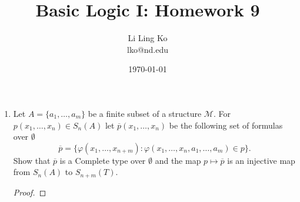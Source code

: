 \documentclass{article}
\begin{document}
\title{Basic Logic I: Homework 9}
\author{Li Ling Ko\\ lko@nd.edu}
\date{\today}
\maketitle

\begin{enumerate}[label={\bf Q\arabic*:}]
  \item Let $A=\{a_1,\ldots,a_m\}$ be a finite subset of a structure
    $\mathcal{M}$. For $p(x_1,\ldots,x_n)\in S_n(A)$ let
    $\overline{p}(x_1,\ldots,x_n)$ be the following set of formulas over
    $\emptyset$
    \[\overline{p}=\{\varphi(x_1,\ldots,x_{n+m}):
    \varphi(x_1,\ldots,x_n,a_1,\ldots,a_m)\in p\}.\]
    Show that $\overline{p}$ is a Complete type over $\emptyset$ and the
    map $p\mapsto\overline{p}$ is an injective map from $S_n(A)$ to
    $S_{n+m}(T)$.

    \begin{proof}
    \end{proof}
\end{enumerate}
\end{document}
